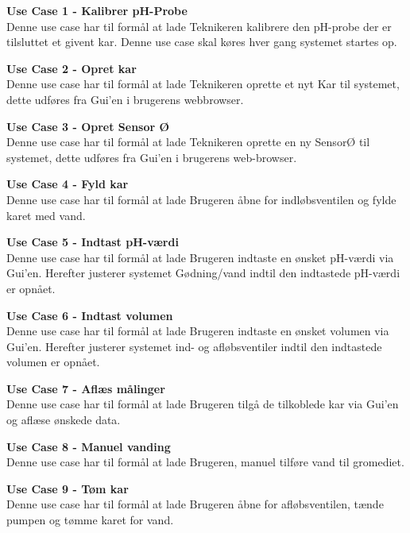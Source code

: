 \textbf{Use Case 1 - Kalibrer pH-Probe} \\
Denne use case har til formål at lade Teknikeren kalibrere den pH-probe der er tilsluttet et givent kar. Denne use case skal køres hver gang systemet startes op.\newline

\textbf{Use Case 2 - Opret kar} \\
Denne use case har til formål at lade Teknikeren oprette et nyt Kar til systemet, dette udføres fra Gui'en i brugerens webbrowser. \newline

\textbf{Use Case 3 - Opret Sensor Ø} \\
Denne use case har til formål at lade Teknikeren oprette en ny SensorØ til systemet, dette udføres fra Gui'en i brugerens web-browser.\newline

\textbf{Use Case 4 - Fyld kar} \\
Denne use case har til formål at lade Brugeren åbne for indløbsventilen og fylde karet med vand.\newline

\textbf{Use Case 5 - Indtast pH-værdi} \\
Denne use case har til formål at lade Brugeren indtaste en ønsket pH-værdi via Gui'en. Herefter justerer systemet Gødning/vand indtil den indtastede pH-værdi er opnået. \newline

\textbf{Use Case 6 - Indtast volumen} \\
Denne use case har til formål at lade Brugeren indtaste en ønsket volumen via Gui'en. Herefter justerer systemet ind- og afløbsventiler indtil den indtastede volumen er opnået.\newline

\textbf{Use Case 7 - Aflæs målinger} \\
Denne use case har til formål at lade Brugeren tilgå de tilkoblede kar via Gui'en og aflæse ønskede data.\newline

\textbf{Use Case 8 - Manuel vanding} \\
Denne use case har til formål at lade Brugeren, manuel tilføre vand til gromediet.\newline

\textbf{Use Case 9 - Tøm kar} \\
Denne use case har til formål at lade Brugeren åbne for afløbsventilen, tænde pumpen og tømme karet for vand.\newline

